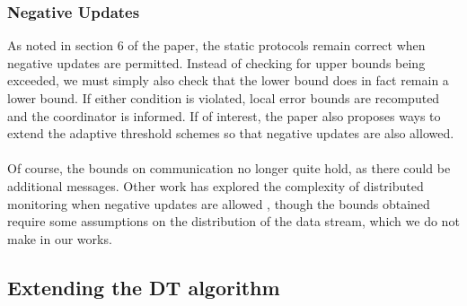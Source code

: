 \documentclass{article}
\begin{document}
\subsubsection*{Negative Updates}
As noted in section 6 of the paper, the static protocols remain correct when negative updates are permitted. Instead of checking for upper bounds being exceeded, we must simply also check that the lower bound does in fact remain a lower bound. If either condition is violated, local error bounds are recomputed and the coordinator is informed. If of interest, the paper also proposes ways to extend the adaptive threshold schemes so that negative updates are also allowed. \\
\\
Of course, the bounds on communication no longer quite hold, as there could be additional messages. Other work has explored the complexity of distributed monitoring when negative updates are allowed \cite{DTwithoutmonotonicity}, though the bounds obtained require some assumptions on the distribution of the data stream, which we do not make in our works.


\subsection*{Extending the DT algorithm}
\end{document}
